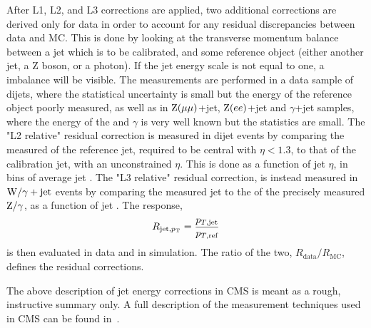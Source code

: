 After L1, L2, and L3 corrections are applied, two additional corrections are derived only for data in order to account for any residual discrepancies between data and MC. This is done by looking at the transverse momentum balance between a jet which is to be calibrated, and some reference object (either another jet, a Z boson, or a photon). If the jet energy scale is not equal to one, a \PT imbalance will be visible. The measurements are performed in a data sample of dijets, where the statistical uncertainty is small but the energy of the reference object poorly measured, as well as in $\mathrm{Z}(\mu\mu)$+jet, $\mathrm{Z}(ee)$+jet and $\gamma$+jet samples, where the energy of the \PZ and $\gamma$ is very well known but the statistics are small. \newline
The  "L2 relative" residual correction is measured in dijet events by comparing the measured \PT of the reference jet, required to be central with $\eta<1.3$, to that of the calibration jet, with an unconstrained $\eta$. This is done as a function of jet $\eta$, in bins of average jet \PT.
The "L3 relative" residual correction, is instead measured in $\mathrm{W}/\gamma+\textrm{jet}$ events by comparing the measured jet \PT to the \PT of the precisely measured $\mathrm{Z}/\gamma$, as a function of jet \PT.
The response, 
\begin{equation*}
R_{\textrm{jet,\ensuremath{p_{\mathrm{T}}}}}=\frac{p_{T,\textrm{jet}}}{p_{T,\textrm{ref}}}
\end{equation*}
is then evaluated in data and in simulation. The ratio of the two, $R_{\textrm{data}}/R_{\textrm{MC}}$, defines the residual corrections.\newline\newline

The above description of jet energy corrections in CMS is meant as a rough, instructive summary only. A full description of the measurement techniques used in CMS can be found in~\cite{jme_jinst}. 

